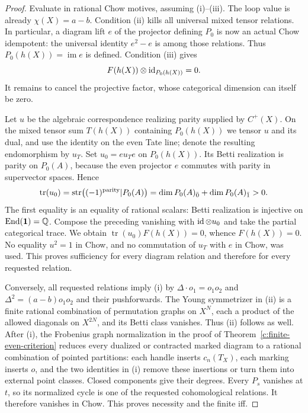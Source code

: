 \begin{proof}
Evaluate in rational Chow motives, assuming (i)--(iii).  The loop
value is already $\chi(X)=a-b$.  Condition (ii) kills all universal
mixed tensor relations.  In particular, a diagram lift $e$ of the
projector defining $P_0$ is now an actual Chow idempotent: the
universal identity $e^2-e$ is among those relations.  Thus
$P_0(h(X))=\operatorname{im}e$ is defined.  Condition (iii) gives
\[
 F(h(X))\otimes\operatorname{id}_{P_0(h(X))}=0.
\]
It remains to cancel the projective factor, whose categorical
dimension can itself be zero.

Let $u$ be the algebraic correspondence realizing parity supplied
by $C^+(X)$.  On the mixed tensor sum $T(h(X))$ containing $P_0(h(X))$
we tensor $u$ and its dual, and use the identity on the even Tate
line; denote the resulting endomorphism by $u_T$.
Set $u_0=e u_T e$ on $P_0(h(X))$.  Its Betti realization is
parity on $P_0(A)$, because the even projector $e$ commutes with
parity in supervector spaces.  Hence
\[
 \operatorname{tr}(u_0)
  =\operatorname{str}\bigl((-1)^{\rm parity}|P_0(A)\bigr)
  =\dim P_0(A)_{\bar0}+\dim P_0(A)_{\bar1}>0.
\]
The first equality is an equality of rational scalars: Betti
realization is injective on $\operatorname{End}(\mathbf1)=\mathbb Q$.
Compose the preceding vanishing with $\operatorname{id}\otimes u_0$ and take
the partial categorical trace.  We obtain
$\operatorname{tr}(u_0)F(h(X))=0$, whence $F(h(X))=0$.
No equality $u^2=1$ in Chow, and no commutation of $u_T$ with $e$
in Chow, was used.  This proves sufficiency for every diagram
relation and therefore for every requested relation.

Conversely, all requested relations imply (i) by
$\Delta\cdot o_1=o_1o_2$ and
$\Delta^2=(a-b)o_1o_2$ and their pushforwards.  The Young
symmetrizer in (ii) is a finite rational combination of permutation
graphs on $X^N$, each a product of the allowed diagonals on
$X^{2N}$, and its Betti class vanishes.  Thus (ii) follows as well.
After (i), the Frobenius graph normalization in the proof of
Theorem~\ref{c:finite-even-criterion} reduces every dualized or
contracted marked diagram to a rational combination of pointed
partitions: each handle inserts $c_n(T_X)$, each marking inserts
$o$, and the two identities in (i) remove these insertions or turn
them into external point classes.  Closed components give their
degrees.  Every $P_s$ vanishes at $t$, so its normalized cycle is
one of the requested cohomological relations.  It therefore
vanishes in Chow.  This proves necessity and the finite iff.
\end{proof}

